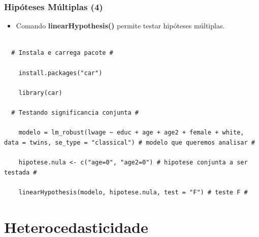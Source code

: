 \documentclass[10pt,slides,xcolor=pdftex,dvipsnames,table]{beamer}
\begin{document}

\begin{frame}[fragile]
	\frametitle{Hipóteses Múltiplas (4)}

\begin{itemize}\itemsep1.2em

\item Comando \textbf{linearHypothesis()} permite testar hipóteses múltiplas.

\end{itemize}

\begin{lstlisting}

  #	Instala e carrega pacote #
  
  	install.packages("car")
  	
  	library(car)

  # Testando significancia conjunta # 
    
    modelo = lm_robust(lwage ~ educ + age + age2 + female + white, data = twins, se_type = "classical") # modelo que queremos analisar #
    
    hipotese.nula <- c("age=0", "age2=0") # hipotese conjunta a ser testada #
    
    linearHypothesis(modelo, hipotese.nula, test = "F") # teste F #

\end{lstlisting}

\end{frame}


\section{Heterocedasticidade}

\end{document}

